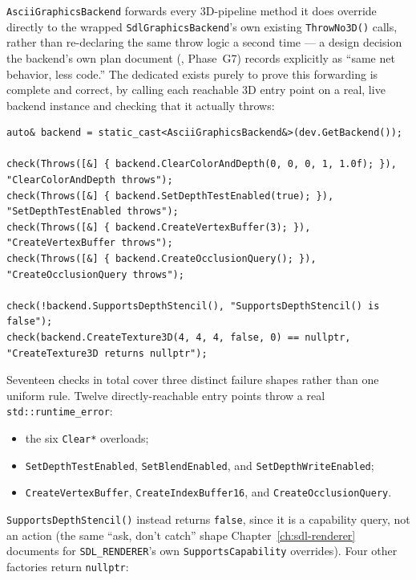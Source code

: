 \texttt{AsciiGraphicsBackend} forwards every 3D-pipeline method it does override directly to
the wrapped \texttt{SdlGraphicsBackend}'s own existing \texttt{ThrowNo3D()} calls, rather than
re-declaring the same throw logic a second time --- a design decision the backend's own plan
document (, Phase~G7) records explicitly as ``same net behavior, less
code.'' The dedicated  exists purely to prove this forwarding
is complete and correct, by calling each reachable 3D entry point on a real, live backend
instance and checking that it actually throws:

\begin{lstlisting}
auto& backend = static_cast<AsciiGraphicsBackend&>(dev.GetBackend());

check(Throws([&] { backend.ClearColorAndDepth(0, 0, 0, 1, 1.0f); }), "ClearColorAndDepth throws");
check(Throws([&] { backend.SetDepthTestEnabled(true); }),            "SetDepthTestEnabled throws");
check(Throws([&] { backend.CreateVertexBuffer(3); }),                "CreateVertexBuffer throws");
check(Throws([&] { backend.CreateOcclusionQuery(); }),                "CreateOcclusionQuery throws");

check(!backend.SupportsDepthStencil(), "SupportsDepthStencil() is false");
check(backend.CreateTexture3D(4, 4, 4, false, 0) == nullptr, "CreateTexture3D returns nullptr");
\end{lstlisting}

Seventeen checks in total cover three distinct failure shapes rather than one uniform rule.
Twelve directly-reachable entry points throw a real \texttt{std::runtime\_error}:

\begin{itemize}
  \item the six \texttt{Clear*} overloads;
  \item \texttt{SetDepthTestEnabled}, \texttt{SetBlendEnabled}, and
        \texttt{SetDepthWriteEnabled};
  \item \texttt{CreateVertexBuffer}, \texttt{CreateIndexBuffer16}, and
        \texttt{CreateOcclusionQuery}.
\end{itemize}

\texttt{SupportsDepthStencil()} instead returns \texttt{false}, since it is a capability query,
not an action (the same ``ask, don't catch'' shape Chapter~\ref{ch:sdl-renderer} documents for
\texttt{SDL\_RENDERER}'s own \texttt{SupportsCapability} overrides). Four other factories
return \texttt{nullptr}:

